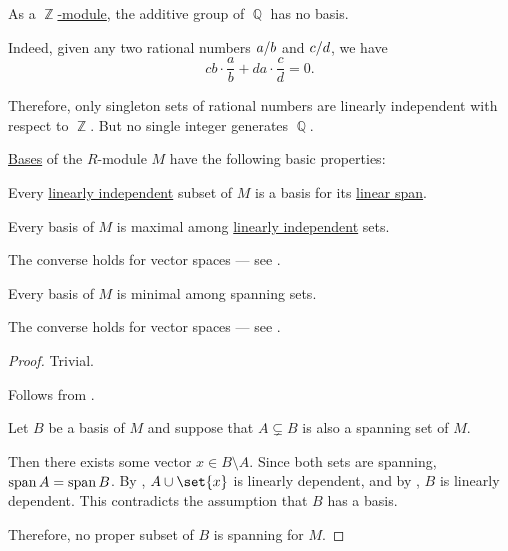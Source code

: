 \begin{example}\label{ex:module_without_basis}
  As a \hyperref[thm:abelian_group_is_module]{\( \BbbZ \)-module}, the additive group of \( \BbbQ \) has no basis.

  Indeed, given any two rational numbers \( a / b \) and \( c / d \), we have
  \begin{equation*}
    cb \cdot \frac a b + da \cdot \frac c d = 0.
  \end{equation*}

  Therefore, only singleton sets of rational numbers are linearly independent with respect to \( \BbbZ \). But no single integer generates \( \BbbQ \).
\end{example}

\begin{proposition}\label{thm:def:hamel_basis}
  \hyperref[def:hamel_basis]{Bases} of the \( R \)-module \( M \) have the following basic properties:
  \begin{thmenum}
     Every \hyperref[def:linear_dependence]{linearly independent} subset of \( M \) is a basis for its \hyperref[def:semimodule/submodel]{linear span}.

     Every basis of \( M \) is maximal among \hyperref[thm:def:linear_dependence]{linearly independent} sets.

    The converse holds for vector spaces --- see .

     Every basis of \( M \) is minimal among spanning sets.

    The converse holds for vector spaces --- see .
  \end{thmenum}
\end{proposition}
\begin{proof}
   Trivial.

   Follows from .

   Let \( B \) be a basis of \( M \) and suppose that \( A \subsetneq B \) is also a spanning set of \( M \).

  Then there exists some vector \( x \in B \setminus A \). Since both sets are spanning, \( \operatorname{span} A = \operatorname{span} B \). By , \( A \cup \set{ x } \) is linearly dependent, and by , \( B \) is linearly dependent. This contradicts the assumption that \( B \) has a basis.

  Therefore, no proper subset of \( B \) is spanning for \( M \).
\end{proof}

